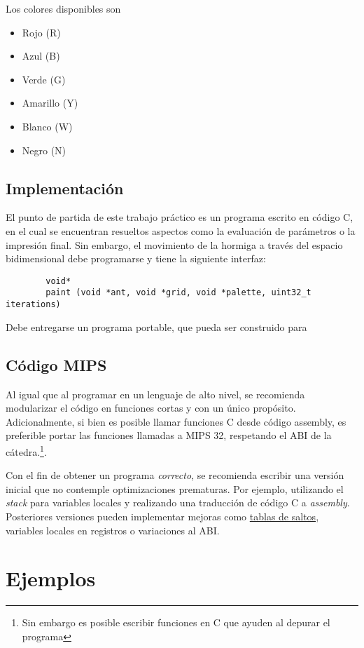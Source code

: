 \documentclass{article}
\begin{document}
Los colores disponibles son
\begin{itemize}
\item Rojo (R)
\item Azul (B)
\item Verde (G)
\item Amarillo (Y)
\item Blanco (W)
\item Negro (N)
\end{itemize}

\subsection{Implementación}
El punto de partida de este trabajo práctico es un programa escrito en código C, en el cual se encuentran resueltos
aspectos como la evaluación de parámetros o la impresión final. Sin embargo, el movimiento de la hormiga a través del
espacio bidimensional debe programarse y tiene la siguiente interfaz:

\begin{verbatim}
        void*
        paint (void *ant, void *grid, void *palette, uint32_t iterations)
\end{verbatim}

Debe entregarse un programa portable, que pueda ser construido para
\subsection{Código MIPS}
Al igual que al programar en un lenguaje de alto nivel, se recomienda modularizar el código en funciones
cortas y con un único propósito. Adicionalmente, si bien es posible llamar funciones C desde código assembly,
es preferible portar las funciones llamadas a MIPS 32, respetando el ABI de la cátedra.\footnote{Sin embargo es posible escribir funciones en C que ayuden
al depurar el programa}.

Con el fin de obtener un programa \textit{correcto}, se recomienda escribir una versión inicial que no contemple
optimizaciones prematuras. Por ejemplo, utilizando el \textit{stack} para variables locales y realizando una traducción
de código C a \textit{assembly}. Posteriores versiones pueden implementar mejoras como \underline{tablas de saltos},
variables locales en registros o variaciones al ABI.

\section{Ejemplos}
\end{document}
